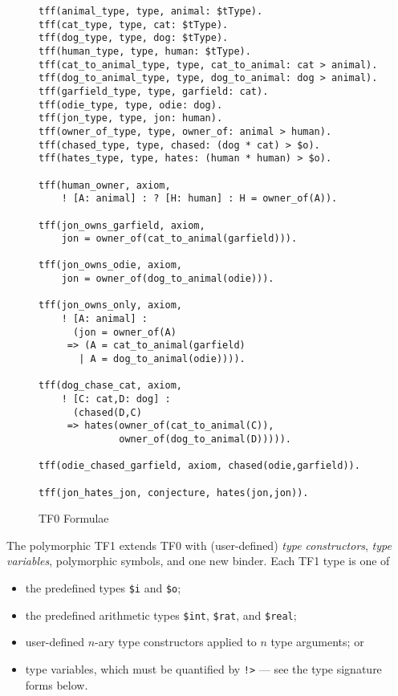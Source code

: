 \begin{figure}[htbp]
\begin{verbatim}
tff(animal_type, type, animal: $tType).
tff(cat_type, type, cat: $tType).
tff(dog_type, type, dog: $tType).
tff(human_type, type, human: $tType).
tff(cat_to_animal_type, type, cat_to_animal: cat > animal).
tff(dog_to_animal_type, type, dog_to_animal: dog > animal).
tff(garfield_type, type, garfield: cat).
tff(odie_type, type, odie: dog).
tff(jon_type, type, jon: human).
tff(owner_of_type, type, owner_of: animal > human).
tff(chased_type, type, chased: (dog * cat) > $o).
tff(hates_type, type, hates: (human * human) > $o).

tff(human_owner, axiom,
    ! [A: animal] : ? [H: human] : H = owner_of(A)).

tff(jon_owns_garfield, axiom,
    jon = owner_of(cat_to_animal(garfield))).

tff(jon_owns_odie, axiom,
    jon = owner_of(dog_to_animal(odie))).

tff(jon_owns_only, axiom,
    ! [A: animal] :
      (jon = owner_of(A)
     => (A = cat_to_animal(garfield)
       | A = dog_to_animal(odie)))).

tff(dog_chase_cat, axiom,
    ! [C: cat,D: dog] :
      (chased(D,C)
     => hates(owner_of(cat_to_animal(C)),
              owner_of(dog_to_animal(D))))).

tff(odie_chased_garfield, axiom, chased(odie,garfield)).

tff(jon_hates_jon, conjecture, hates(jon,jon)).
\end{verbatim}
\caption{TF0 Formulae}
\label{fig:tfx/TF0Example}
\end{figure}

The polymorphic TF1 extends TF0 with (user-defined) {\em type constructors}, 
{\em type variables}, polymorphic symbols, and one new binder.
Each TF1 type is one of
\begin{itemize}
\item the predefined types {\tt \$i} and {\tt \$o};
\item the predefined arithmetic types {\tt \$int}, {\tt \$rat}, and 
      {\tt \$real};
\item user-defined $n$-ary type constructors applied to $n$ type arguments; or
\item type variables, which must be quantified by {\tt !>} --- see the type
      signature forms below.
\end{itemize}

